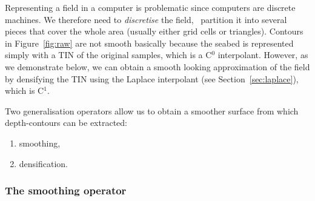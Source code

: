 Representing a field in a computer is problematic since computers are discrete machines.
We therefore need to \emph{discretise} the field, \ie\ partition it into several pieces that cover the whole area (usually either grid cells or triangles).
Contours in Figure~\ref{fig:raw} are not smooth basically because the seabed is represented simply with a TIN of the original samples, which is a C$^0$ interpolant.
However, as we demonstrate below, we can obtain a smooth looking approximation of the field by densifying the TIN using the Laplace interpolant (see Section~\ref{sec:laplace}), which is C$^1$.

%

Two generalisation operators allow us to obtain a smoother surface from which depth-contours can be extracted: 
\begin{enumerate}
  \item smoothing, 
  \item densification.
\end{enumerate}


%
\subsubsection{The smoothing operator}
\label{chap:myapproach:smoothing}

